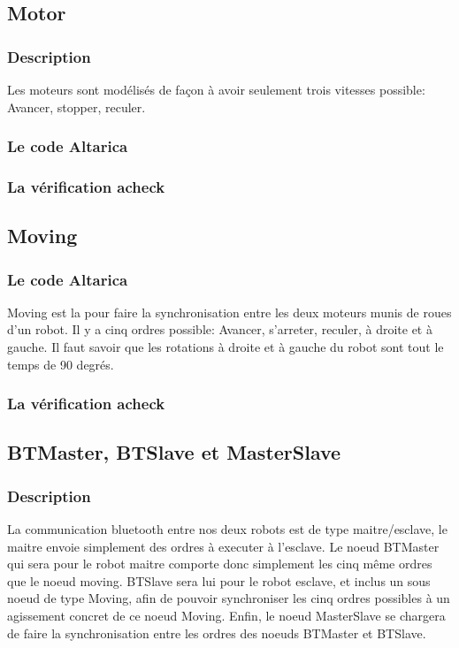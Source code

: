   \subsection{Motor}
  
   \subsubsection{Description}
   Les moteurs sont modélisés de façon à avoir seulement trois vitesses
   possible: Avancer, stopper, reculer.

   \subsubsection{Le code Altarica}
   
   
   \subsubsection{La vérification acheck}
   
   
  \subsection{Moving}

   \subsubsection{Le code Altarica}
   
   
   Moving est la pour faire la synchronisation entre les deux moteurs
   munis de roues d'un robot. Il y a cinq ordres possible: Avancer,
   s'arreter, reculer, à droite et à gauche. Il faut savoir que les
   rotations à droite et à gauche du robot sont tout le temps de 90
   degrés.
  
   \subsubsection{La vérification acheck}
   
 
  \subsection{BTMaster, BTSlave et MasterSlave}
  
   \subsubsection{Description}
   La communication bluetooth entre nos deux robots est de type
   maitre/esclave, le maitre envoie simplement des ordres à executer à
   l'esclave. Le noeud BTMaster qui sera pour le robot maitre comporte
   donc simplement les cinq même ordres que le noeud moving. BTSlave
   sera lui pour le robot esclave, et inclus un sous noeud de type
   Moving, afin de pouvoir synchroniser les cinq ordres possibles à un
   agissement concret de ce noeud Moving. Enfin, le noeud MasterSlave se
   chargera de faire la synchronisation entre les ordres des noeuds
   BTMaster et BTSlave.

